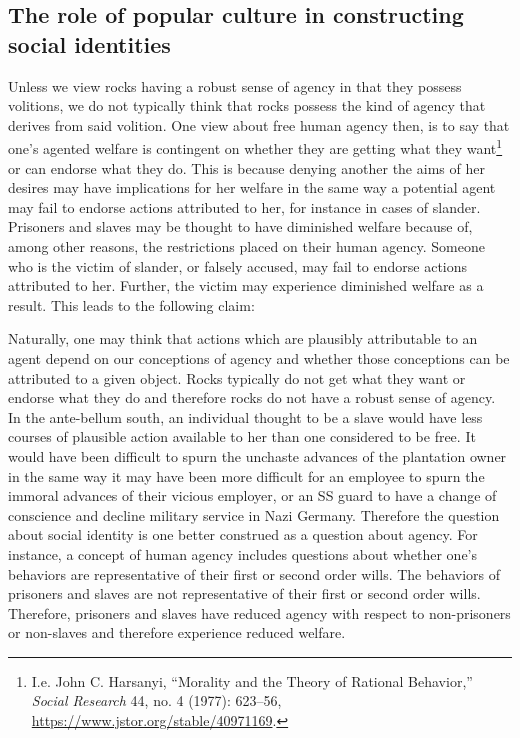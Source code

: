 \documentclass[phdthesis,12pt,final,a4paper]{wuthesis}
\theoremstyle{definition}
\theoremstyle{definition}
\theoremstyle{definition}
\theoremstyle{definition}
\theoremstyle{remark}
\begin{document}
\subsection*{The role of popular culture in constructing social identities}\label{the-role-of-popular-culture-in-constructing-social-identities}

Unless we view rocks having a robust sense of agency in that they possess volitions, we do not typically think that rocks possess the kind of agency that derives from said volition. One view about free human agency then, is to say that one's agented welfare is contingent on whether they are getting what they want\footnote{I.e. John C. Harsanyi, {``Morality and the {Theory} of {Rational Behavior},''} \emph{Social Research} 44, no. 4 (1977): 623--56, \url{https://www.jstor.org/stable/40971169}.} or can endorse what they do. This is because denying another the aims of her desires may have implications for her welfare in the same way a potential agent may fail to endorse actions attributed to her, for instance in cases of slander. Prisoners and slaves may be thought to have diminished welfare because of, among other reasons, the restrictions placed on their human agency. Someone who is the victim of slander, or falsely accused, may fail to endorse actions attributed to her. Further, the victim may experience diminished welfare as a result. This leads to the following claim:

\begin{Shaded}
\begin{Highlighting}[]
\end{Highlighting}
\end{Shaded}

Naturally, one may think that actions which are plausibly attributable to an agent depend on our conceptions of agency and whether those conceptions can be attributed to a given object. Rocks typically do not get what they want or endorse what they do and therefore rocks do not have a robust sense of agency. In the ante-bellum south, an individual thought to be a slave would have less courses of plausible action available to her than one considered to be free. It would have been difficult to spurn the unchaste advances of the plantation owner in the same way it may have been more difficult for an employee to spurn the immoral advances of their vicious employer, or an SS guard to have a change of conscience and decline military service in Nazi Germany. Therefore the question about social identity is one better construed as a question about agency. For instance, a concept of human agency includes questions about whether one's behaviors are representative of their first or second order wills. The behaviors of prisoners and slaves are not representative of their first or second order wills. Therefore, prisoners and slaves have reduced agency with respect to non-prisoners or non-slaves and therefore experience reduced welfare.
\end{document}
